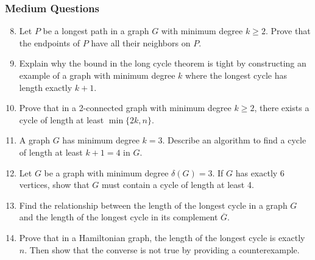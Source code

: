 \documentclass{article}
\theoremstyle{definition}
\begin{document}
\subsubsection{Medium Questions}
\begin{enumerate}\setcounter{enumi}{7}
\item Let $P$ be a longest path in a graph $G$ with minimum degree $k \geq 2$. Prove that the endpoints of $P$ have all their neighbors on $P$.

\item Explain why the bound in the long cycle theorem is tight by constructing an example of a graph with minimum degree $k$ where the longest cycle has length exactly $k+1$.

\item Prove that in a 2-connected graph with minimum degree $k \geq 2$, there exists a cycle of length at least $\min\{2k, n\}$.

\item A graph $G$ has minimum degree $k=3$. Describe an algorithm to find a cycle of length at least $k+1=4$ in $G$.

\item Let $G$ be a graph with minimum degree $\delta(G) = 3$. If $G$ has exactly 6 vertices, show that $G$ must contain a cycle of length at least 4.

\item Find the relationship between the length of the longest cycle in a graph $G$ and the length of the longest cycle in its complement $\overline{G}$.

\item Prove that in a Hamiltonian graph, the length of the longest cycle is exactly $n$. Then show that the converse is not true by providing a counterexample.
\end{enumerate}
\end{document}
